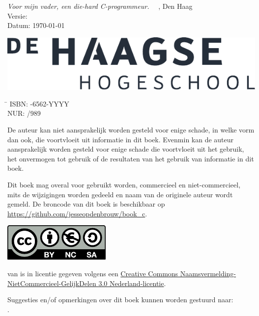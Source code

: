 \maketitle

\hspace*{0em}
\vfill
\textsl{Voor mijn vader, een die-hard C-programmeur.}
\vfill
\textcopyright\the\year\ \ \bookauthor, Den Haag\\
Versie: \bookversion\\
Datum: \today

\vspace*{.25cm}
\ifusebookasbook\else
\includegraphics[scale=0.5]{images/HHS_NL_grijs_FC}
\fi

\ifusebookasbook
\vspace*{1cm}
\begin{tabbing}
\hspace{1.2cm}\=\kill
 ISBN: -6562-YYYY \\ 
 NUR:  /989
\end{tabbing}
\fi

\vspace*{1cm}
De auteur kan niet aansprakelijk worden gesteld voor enige schade, in welke vorm dan
ook, die voortvloeit uit informatie in dit boek. Evenmin kan de auteur aansprakelijk
worden gesteld voor enige schade die voortvloeit uit het gebruik, het onvermogen tot
gebruik of de resultaten van het gebruik van informatie in dit boek.

\vspace*{0.5cm}
Dit boek mag overal voor gebruikt worden, commercieel en niet-commercieel, mits de
wijzigingen worden gedeeld en naam van de originele auteur wordt gemeld. De broncode
van dit boek is beschikbaar op \url{https://github.com/jesseopdenbrouw/book_c}.


\vspace*{2cm}
\includegraphics{images/by-nc-sa_eu.pdf}
\par
{\small%
\booktitle{} van \bookauthor{} is in licentie gegeven volgens
een \href{http://creativecommons.org/licenses/by-nc-sa/3.0/nl/}{Creative Commons
Naamsvermelding-NietCommercieel-GelijkDelen 3.0 Nederland-licentie}.

Suggesties en/of opmerkingen over dit boek kunnen worden gestuurd naar:\\
\href{mailto:\email}{\email}.}
